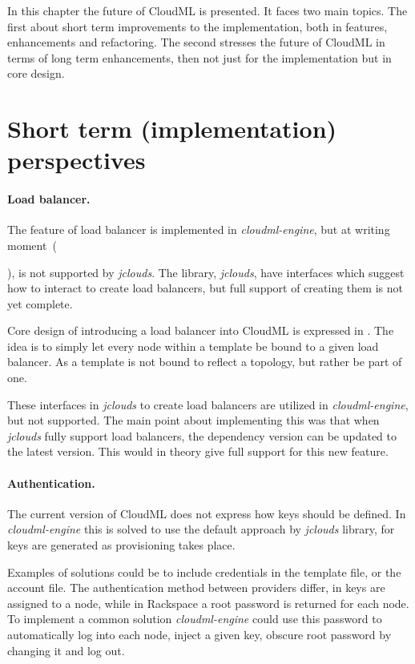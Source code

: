 
In this chapter the future of CloudML is presented.
It faces two main topics.
The first about short term improvements to the implementation, both in features, enhancements and refactoring.
The second stresses the future of CloudML in terms of long term enhancements,
then not just for the implementation but in core design.

\section{Short term (implementation) perspectives}

\paragraph{Load balancer.}


The feature of load balancer is implemented in \emph{cloudml-engine}, but at writing moment~(\date{April 2012}),
is not supported by \emph{jclouds}.
The library, \emph{jclouds}, have interfaces which suggest how to interact to create load balancers,
but full support of creating them is not yet complete.

Core design of introducing a load balancer into CloudML is expressed in .
The idea is to simply let every node within a template be bound to a given load balancer.
As a template is not bound to reflect a topology, but rather be part of one.

These interfaces in \emph{jclouds} to create load balancers are utilized in \emph{cloudml-engine}, 
but not supported.
The main point about implementing this was that when \emph{jclouds} fully support load balancers,
the dependency version can be updated to the latest version.
This would in theory give full support for this new feature.

\paragraph{Authentication.}

The current version of CloudML does not express how  keys should be defined.
In \emph{cloudml-engine} this is solved to use the default approach by \emph{jclouds} library,
\ie for  keys are generated as provisioning takes place.

Examples of solutions could be to include credentials in the template file, or the account file.
The authentication method between providers differ, \eg in   keys are assigned to a node,
while in Rackspace a root password is returned for each node.
To implement a common solution \emph{cloudml-engine} could use this password to automatically 
log into each node, inject a given  key, obscure root password by changing it and log out.


